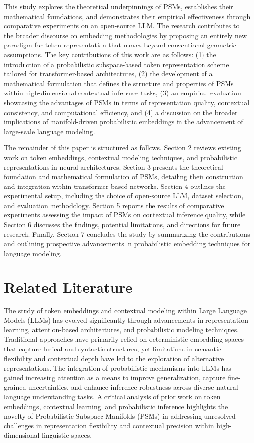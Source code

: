 \documentclass{article}
\begin{document}
This study explores the theoretical underpinnings of PSMs, establishes their mathematical foundations, and demonstrates their empirical effectiveness through comparative experiments on an open-source LLM. The research contributes to the broader discourse on embedding methodologies by proposing an entirely new paradigm for token representation that moves beyond conventional geometric assumptions. The key contributions of this work are as follows: (1) the introduction of a probabilistic subspace-based token representation scheme tailored for transformer-based architectures, (2) the development of a mathematical formulation that defines the structure and properties of PSMs within high-dimensional contextual inference tasks, (3) an empirical evaluation showcasing the advantages of PSMs in terms of representation quality, contextual consistency, and computational efficiency, and (4) a discussion on the broader implications of manifold-driven probabilistic embeddings in the advancement of large-scale language modeling.

The remainder of this paper is structured as follows. Section 2 reviews existing work on token embeddings, contextual modeling techniques, and probabilistic representations in neural architectures. Section 3 presents the theoretical foundation and mathematical formulation of PSMs, detailing their construction and integration within transformer-based networks. Section 4 outlines the experimental setup, including the choice of open-source LLM, dataset selection, and evaluation methodology. Section 5 reports the results of comparative experiments assessing the impact of PSMs on contextual inference quality, while Section 6 discusses the findings, potential limitations, and directions for future research. Finally, Section 7 concludes the study by summarizing the contributions and outlining prospective advancements in probabilistic embedding techniques for language modeling.


\section{Related Literature}

The study of token embeddings and contextual modeling within Large Language Models (LLMs) has evolved significantly through advancements in representation learning, attention-based architectures, and probabilistic modeling techniques. Traditional approaches have primarily relied on deterministic embedding spaces that capture lexical and syntactic structures, yet limitations in semantic flexibility and contextual depth have led to the exploration of alternative representations. The integration of probabilistic mechanisms into LLMs has gained increasing attention as a means to improve generalization, capture fine-grained uncertainties, and enhance inference robustness across diverse natural language understanding tasks. A critical analysis of prior work on token embeddings, contextual learning, and probabilistic inference highlights the novelty of Probabilistic Subspace Manifolds (PSMs) in addressing unresolved challenges in representation flexibility and contextual precision within high-dimensional linguistic spaces.
\end{document}
